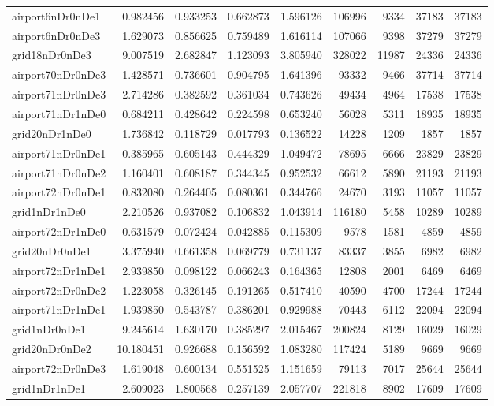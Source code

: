 \documentclass[../../../thesis.tex]{subfiles}
\begin{document}
\begin{longtable}{|l|r|r|r|r|r|r|r|r|}
airport6nDr0nDe1 & 0.982456 & 0.933253 & 0.662873 & 1.596126 & 106996 & 9334 & 37183 & 37183 \\
airport6nDr0nDe3 & 1.629073 & 0.856625 & 0.759489 & 1.616114 & 107066 & 9398 & 37279 & 37279 \\
grid18nDr0nDe3 & 9.007519 & 2.682847 & 1.123093 & 3.805940 & 328022 & 11987 & 24336 & 24336 \\
airport70nDr0nDe3 & 1.428571 & 0.736601 & 0.904795 & 1.641396 & 93332 & 9466 & 37714 & 37714 \\
airport71nDr0nDe3 & 2.714286 & 0.382592 & 0.361034 & 0.743626 & 49434 & 4964 & 17538 & 17538 \\
airport71nDr1nDe0 & 0.684211 & 0.428642 & 0.224598 & 0.653240 & 56028 & 5311 & 18935 & 18935 \\
grid20nDr1nDe0 & 1.736842 & 0.118729 & 0.017793 & 0.136522 & 14228 & 1209 & 1857 & 1857 \\
airport71nDr0nDe1 & 0.385965 & 0.605143 & 0.444329 & 1.049472 & 78695 & 6666 & 23829 & 23829 \\
airport71nDr0nDe2 & 1.160401 & 0.608187 & 0.344345 & 0.952532 & 66612 & 5890 & 21193 & 21193 \\
airport72nDr0nDe1 & 0.832080 & 0.264405 & 0.080361 & 0.344766 & 24670 & 3193 & 11057 & 11057 \\
grid1nDr1nDe0 & 2.210526 & 0.937082 & 0.106832 & 1.043914 & 116180 & 5458 & 10289 & 10289 \\
airport72nDr1nDe0 & 0.631579 & 0.072424 & 0.042885 & 0.115309 & 9578 & 1581 & 4859 & 4859 \\
grid20nDr0nDe1 & 3.375940 & 0.661358 & 0.069779 & 0.731137 & 83337 & 3855 & 6982 & 6982 \\
airport72nDr1nDe1 & 2.939850 & 0.098122 & 0.066243 & 0.164365 & 12808 & 2001 & 6469 & 6469 \\
airport72nDr0nDe2 & 1.223058 & 0.326145 & 0.191265 & 0.517410 & 40590 & 4700 & 17244 & 17244 \\
airport71nDr1nDe1 & 1.939850 & 0.543787 & 0.386201 & 0.929988 & 70443 & 6112 & 22094 & 22094 \\
grid1nDr0nDe1 & 9.245614 & 1.630170 & 0.385297 & 2.015467 & 200824 & 8129 & 16029 & 16029 \\
grid20nDr0nDe2 & 10.180451 & 0.926688 & 0.156592 & 1.083280 & 117424 & 5189 & 9669 & 9669 \\
airport72nDr0nDe3 & 1.619048 & 0.600134 & 0.551525 & 1.151659 & 79113 & 7017 & 25644 & 25644 \\
grid1nDr1nDe1 & 2.609023 & 1.800568 & 0.257139 & 2.057707 & 221818 & 8902 & 17609 & 17609 \\

\end{longtable}
\end{document}
